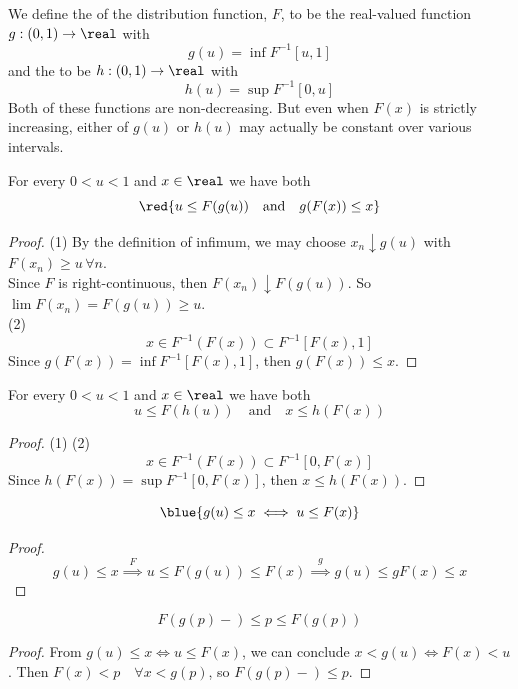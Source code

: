 \documentclass[11pt]{article}
\numberwithin{equation}{section}
\begin{document}
 We define the  of the distribution function, $F$, to be the real-valued function $g:(0, 1) \rightarrow \real$ with
\begin{equation}
	g(u) = \inf F^{-1}[u, 1]
\end{equation}
and the  to be
$h:(0,1) \rightarrow \real$ with
\begin{equation}
	h(u) = \sup F^{-1}[0,u]
\end{equation}
\remark
Both of these functions are non-decreasing. But even when $F(x)$ is strictly increasing, either of $g(u)$ or $h(u)$ may actually be constant over various intervals.

\proposition For every $0<u<1$ and $x \in \real$ we have both
\begin{equation}
	\red{u \leq F(g(u)) \quad \text{and} \quad g(F(x)) \leq x}
\end{equation}
\begin{proof}
	(1) By the definition of infimum, we may choose $x_n \downarrow g(u)$ with $F(x_n) \geq u \, \forall n$. \\
	Since $F$ is right-continuous, then $F(x_n) \downarrow F(g(u))$. So $\lim F(x_n) = F(g(u)) \geq u$. \\
	(2) $$x \in F^{-1}(F(x)) \subset F^{-1}[F(x), 1]$$
	Since $g(F(x)) = \inf F^{-1}[F(x), 1]$, then $g(F(x)) \leq x$.
\end{proof}

\proposition For every $0<u<1$ and $x \in \real$ we have both
\begin{equation}
	u \leq F(h(u)) \quad \text{and} \quad x \leq h(F(x))
\end{equation}
\begin{proof}
	(1) 
	(2) $$x \in F^{-1}(F(x)) \subset F^{-1}[0, F(x)]$$
	Since $h(F(x)) = \sup F^{-1}[0, F(x)]$, then $x \leq h(F(x))$.
\end{proof}

\corollary \label{quantile iff} \begin{equation}\blue{g(u) \leq x \iff u \leq F(x)}\end{equation}
\begin{proof}
	$$g(u) \leq x \overset{F}{\implies} u \leq F(g(u)) \leq F(x) \overset{g}{\implies} g(u) \leq g F(x) \leq x$$
\end{proof}

\corollary 
\begin{equation}
	F(g(p)-) \leq p \leq F(g(p))
\end{equation}
\begin{proof}
	From $g(u) \leq x \iff u \leq F(x)$, we can conclude $x < g(u) \iff F(x) < u$.
	Then $F(x) < p \quad \forall x < g(p)$, so $F(g(p)-) \leq p$.
\end{proof}
\end{document}
